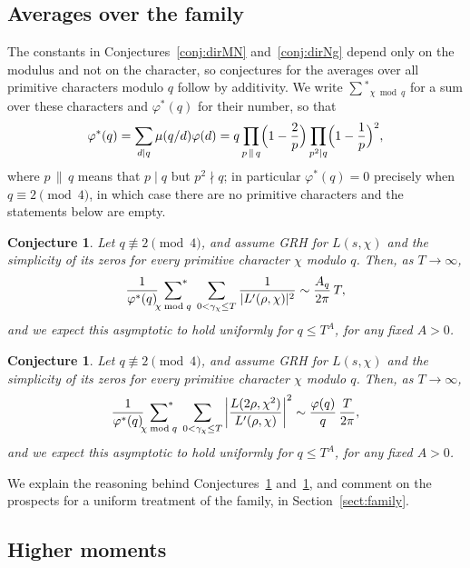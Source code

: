 \documentclass[10pt,a4paper]{amsart}
\newtheorem{conjecture}[theorem]{Conjecture}
\numberwithin{equation}{section}
\begin{document}
\subsection{Averages over the family}\label{subsect:families}
The constants in Conjectures~\ref{conj:dirMN} and~\ref{conj:dirNg} depend only on the modulus and not on the character, so conjectures for the averages over all primitive characters modulo $q$ follow by additivity. We write $\sum{^*}_{\chi\bmod q}$ for a sum over these characters and $\varphi^*(q)$ for their number, so that
\begin{equation}\label{eq:phistar}
\varphi^*(q)=\sum_{d\mid q}\mu(q/d)\varphi(d)=q\prod_{p\,\|\,q}\Bigl(1-\frac2p\Bigr)\prod_{p^2\mid q}\Bigl(1-\frac1p\Bigr)^{2},
\end{equation}
where $p\,\|\,q$ means that $p\mid q$ but $p^2\nmid q$; in particular $\varphi^*(q)=0$ precisely when $q\equiv2\pmod4$, in which case there are no primitive characters and the statements below are empty.

\begin{conjecture}\label{conj:famA}
Let $q\not\equiv2\pmod4$, and assume GRH for $L(s,\chi)$ and the simplicity of its zeros for every primitive character $\chi$ modulo $q$. Then, as $T\to\infty$,
\[
\frac{1}{\varphi^*(q)} \sideset{}{^*}\sum_{\chi\bmod q}\;\sum_{0<\gamma_\chi\le T}\frac{1}{|L'(\rho,\chi)|^2}\sim \frac{A_q}{2\pi}\,T,
\]
and we expect this asymptotic to hold uniformly for $q\le T^{A}$, for any fixed $A>0$.
\end{conjecture}

\begin{conjecture}\label{conj:famB}
Let $q\not\equiv2\pmod4$, and assume GRH for $L(s,\chi)$ and the simplicity of its zeros for every primitive character $\chi$ modulo $q$. Then, as $T\to\infty$,
\[
\frac{1}{\varphi^*(q)}  \sideset{}{^*}\sum_{\chi\bmod q}\;\sum_{0<\gamma_\chi\le T}\left|\frac{L(2\rho,\chi^2)}{L'(\rho,\chi)}\right|^2\sim \frac{\varphi(q)}{q}\,\frac{T}{2\pi},
\]
and we expect this asymptotic to hold uniformly for $q\le T^{A}$, for any fixed $A>0$.
\end{conjecture}

We explain the reasoning behind Conjectures~\ref{conj:famA} and~\ref{conj:famB}, and comment on the prospects for a uniform treatment of the family, in Section~\ref{sect:family}.

\subsection{Higher moments}\label{sec:higher}
\end{document}
